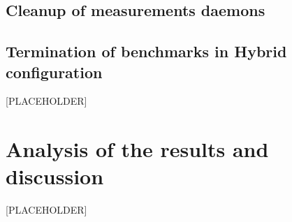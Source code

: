 \subsection{Cleanup of measurements daemons}

\subsection{Termination of benchmarks in Hybrid configuration}


[PLACEHOLDER]

\newpage

\section{Analysis of the results and discussion}



[PLACEHOLDER]
